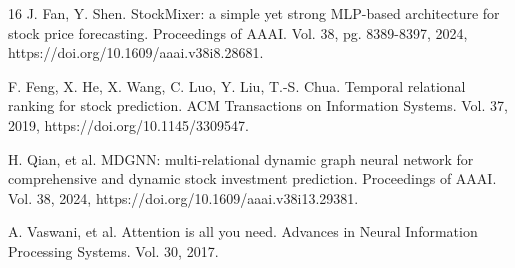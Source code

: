 \documentclass[12pt]{article}
\begin{document}
\begin{thebibliography}{16}
 J. Fan, Y. Shen. StockMixer: a simple yet strong MLP-based architecture for stock price forecasting. Proceedings of AAAI. Vol. 38, pg. 8389-8397, 2024, https://doi.org/10.1609/aaai.v38i8.28681.

 F. Feng, X. He, X. Wang, C. Luo, Y. Liu, T.-S. Chua. Temporal relational ranking for stock prediction. ACM Transactions on Information Systems. Vol. 37, 2019, https://doi.org/10.1145/3309547.

 H. Qian, et al. MDGNN: multi-relational dynamic graph neural network for comprehensive and dynamic stock investment prediction. Proceedings of AAAI. Vol. 38, 2024, https://doi.org/10.1609/aaai.v38i13.29381.

 A. Vaswani, et al. Attention is all you need. Advances in Neural Information Processing Systems. Vol. 30, 2017.

\end{thebibliography}
\end{document}
